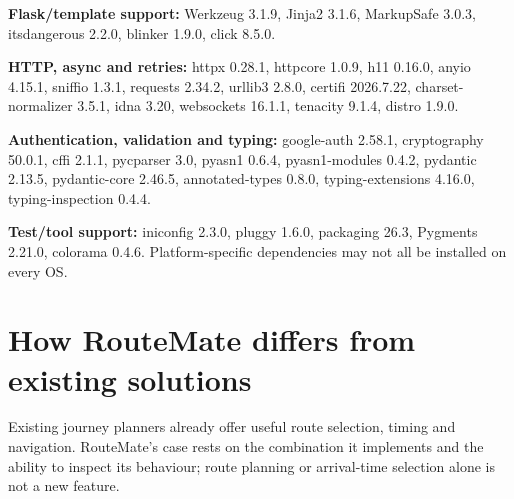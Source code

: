 \documentclass[10pt,a4paper]{article}
\begin{document}
{\small
\textbf{Flask/template support:} Werkzeug 3.1.9, Jinja2 3.1.6, MarkupSafe 3.0.3, itsdangerous 2.2.0, blinker 1.9.0, click 8.5.0.

\textbf{HTTP, async and retries:} httpx 0.28.1, httpcore 1.0.9, h11 0.16.0, anyio 4.15.1, sniffio 1.3.1, requests 2.34.2, urllib3 2.8.0, certifi 2026.7.22, charset-normalizer 3.5.1, idna 3.20, websockets 16.1.1, tenacity 9.1.4, distro 1.9.0.

\textbf{Authentication, validation and typing:} google-auth 2.58.1, cryptography 50.0.1, cffi 2.1.1, pycparser 3.0, pyasn1 0.6.4, pyasn1-modules 0.4.2, pydantic 2.13.5, pydantic-core 2.46.5, annotated-types 0.8.0, typing-extensions 4.16.0, typing-inspection 0.4.4.

\textbf{Test/tool support:} iniconfig 2.3.0, pluggy 1.6.0, packaging 26.3, Pygments 2.21.0, colorama 0.4.6. Platform-specific dependencies may not all be installed on every OS.
}

\newpage
\section{How RouteMate differs from existing solutions}
Existing journey planners already offer useful route selection, timing and navigation. RouteMate's case rests on the combination it implements and the ability to inspect its behaviour; route planning or arrival-time selection alone is not a new feature.
\end{document}
